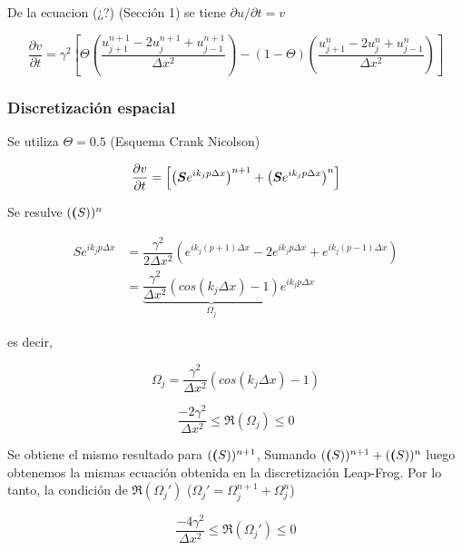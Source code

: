 De la ecuacion (¿?) (Sección 1) se tiene $\partial u / \partial t = v$

\begin{equation}
\dfrac{\partial v}{\partial t} = \gamma ^2 \left[ \Theta \left( \dfrac{ u_{j+1}^{n+1} -2u_{j}^{n+1} + u_{j-1}^{n+1} }{\Delta x^2} \right) - (1-\Theta) \left( \dfrac{ u_{j+1}^{n} -2u_{j}^{n} + u_{j-1}^{n} }{\Delta x^2} \right) \right]
\end{equation} 

\subsubsection{Discretización espacial}

Se utiliza $\Theta=0.5$ (Esquema Crank Nicolson)

\begin{equation}
\dfrac{\partial v}{\partial t} = \left[ \left( \boldsymbol{S} e^{i k_j p \Delta x} \right)^{n+1} + \left( \boldsymbol{S} e^{i k_j p \Delta x} \right)^{n}  \right]
\end{equation}

Se resulve $(\boldsymbol{(}S))^n$

\begin{align*}
S e ^ { i k_j p \Delta x } &= \dfrac{\gamma^2}{2 \Delta x^2} \left( e ^ { i k_j (p+1) \Delta x } - 2 e ^ { i k_j p \Delta x } + e ^ { i k_j (p-1) \Delta x } \right) \\
&= \underbrace{\dfrac{\gamma^2}{\Delta x^2} \left( cos(k_j \Delta x) - 1 \right)}_{\Omega_j} e ^ { i k_j p \Delta x}
\end{align*}

es decir,

\begin{equation} \label{OMEGA_j}
\Omega_j = \dfrac{\gamma^2}{\Delta x^2} \left( cos(k_j \Delta x) - 1 \right)
\end{equation}

\begin{equation} \label{CONDICION_OMEGA_j_NM}
\dfrac{-2 \gamma^2}{\Delta x^2} \leq \Re(\Omega_j) \leq 0
\end{equation}

Se obtiene el mismo resultado para $(\boldsymbol{(}S))^{n+1}$, Sumando $(\boldsymbol{(}S))^{n+1} + (\boldsymbol{(}S))^{n}$ luego obtenemos la mismas ecuación obtenida en la discretización Leap-Frog. Por lo tanto, la condición de $\Re(\Omega_j')$ ($\Omega_j' = \Omega_j^{n+1} + \Omega_j^{n}$)

\begin{equation}
\dfrac{-4 \gamma^2}{\Delta x^2} \leq \Re(\Omega_j') \leq 0
\end{equation}

